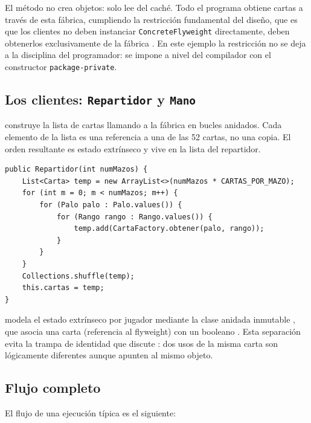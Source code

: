 \documentclass{article}
\begin{document}
El método  no crea objetos: solo lee del caché. Todo el programa obtiene cartas a través de esta fábrica, cumpliendo la restricción  fundamental del diseño, que es que los clientes no deben instanciar \texttt{ConcreteFlyweight} directamente, deben obtenerlos exclusivamente de la fábrica \cite[p.~199]{gamma1994design}. En este ejemplo la restricción no se deja a la disciplina del programador: se impone a nivel del compilador con el constructor \texttt{package-private}.

\subsection{Los clientes: \texttt{Repartidor} y \texttt{Mano}}

 construye la lista de cartas llamando a la fábrica en bucles anidados. Cada elemento de la lista es una referencia a una de las 52 cartas, no una copia. El orden resultante es estado extrínseco y vive en la lista del repartidor.

\begin{verbatim}
public Repartidor(int numMazos) {
    List<Carta> temp = new ArrayList<>(numMazos * CARTAS_POR_MAZO);
    for (int m = 0; m < numMazos; m++) {
        for (Palo palo : Palo.values()) {
            for (Rango rango : Rango.values()) {
                temp.add(CartaFactory.obtener(palo, rango));
            }
        }
    }
    Collections.shuffle(temp);
    this.cartas = temp;
}
\end{verbatim}

 modela el estado extrínseco por jugador mediante la clase anidada inmutable , que asocia una carta (referencia al flyweight) con un booleano . Esta separación evita la trampa de identidad que discute \cite[p.~197]{gamma1994design}: dos usos de la misma carta son lógicamente diferentes aunque apunten al mismo objeto.
\clearpage
\subsection{Flujo completo}

El flujo de una ejecución típica es el siguiente:
\end{document}
